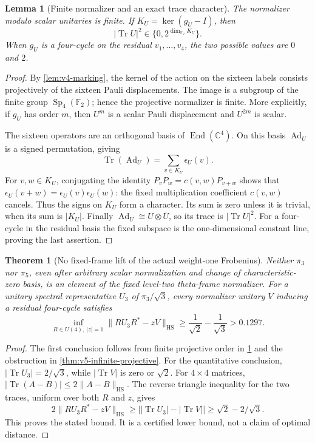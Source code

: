 \documentclass[11pt]{article}
\newtheorem{theorem}{Theorem}[section]
\newtheorem{lemma}[lemma]{Lemma}
\theoremstyle{definition}
\theoremstyle{remark}
\newcommand{\C}{\mathbb C}
\newcommand{\F}{\mathbb F}
\newcommand{\Tr}{\operatorname{Tr}}
\newcommand{\End}{\operatorname{End}}
\newcommand{\HS}{\mathrm{HS}}
\newcommand{\norm}[1]{\lVert#1\rVert}
\begin{document}
\begin{lemma}[Finite normalizer and an exact trace character]
\label{lem:v5-normalizer-trace}
The normalizer modulo scalar unitaries is finite. If
$K_U=\ker(g_U-I)$, then
\begin{equation}
 \boxed{|\Tr U|^2\in\{0,2^{\dim_{\F_2}K_U}\}.}
 \label{eq:v5-trace-character}
\end{equation}
When $g_U$ is a four-cycle on the residual $v_1,\ldots,v_4$, the two
possible values are $0$ and $2$.
\end{lemma}
\begin{proof}
By \cref{lem:v4-marking}, the kernel of the action on the sixteen labels
consists projectively of the sixteen Pauli displacements. The image is a
subgroup of the finite group $\operatorname{Sp}_4(\F_2)$; hence the
projective normalizer is finite. More explicitly, if $g_U$ has order $m$,
then $U^m$ is a scalar Pauli displacement and $U^{2m}$ is scalar.

The sixteen operators are an orthogonal basis of $\End(\C^4)$. On this
basis $\operatorname{Ad}_U$ is a signed permutation, giving
\[
 \Tr(\operatorname{Ad}_U)=\sum_{v\in K_U}\epsilon_U(v).
\]
For $v,w\in K_U$, conjugating the identity
$P_vP_w=c(v,w)P_{v+w}$ shows that
$\epsilon_U(v+w)=\epsilon_U(v)\epsilon_U(w)$: the fixed multiplication
coefficient $c(v,w)$ cancels. Thus the signs on $K_U$ form a character.
Its sum is zero unless it is trivial, when its sum is $|K_U|$.
Finally $\operatorname{Ad}_U\cong U\otimes\overline U$, so its trace is
$|\Tr U|^2$. For a four-cycle in the residual basis the fixed subspace is
the one-dimensional constant line, proving the last assertion.
\end{proof}

\begin{theorem}[No fixed-frame lift of the actual weight-one Frobenius]
\label{thm:v5-no-fixed-theta}
Neither $\pi_3$ nor $\pi_5$, even after arbitrary scalar normalization and
change of characteristic-zero basis, is an element of the fixed
level-two theta-frame normalizer.
For a unitary spectral representative $U_3$ of $\pi_3/\sqrt3$, every
normalizer unitary $V$ inducing a residual four-cycle satisfies
\begin{equation}
 \boxed{
 \inf_{R\in U(4),\ |z|=1}\norm{RU_3R^*-zV}_{\HS}
 \ge \frac1{\sqrt2}-\frac1{\sqrt3}>0.1297.}
 \label{eq:v5-normalizer-distance}
\end{equation}
\end{theorem}
\begin{proof}
The first conclusion follows from finite projective order in
\cref{lem:v5-normalizer-trace} and the obstruction in
\cref{thm:v5-infinite-projective}. For the quantitative conclusion,
$|\Tr U_3|=2/\sqrt3$, while $|\Tr V|$ is zero or $\sqrt2$.
For $4\times4$ matrices,
$|\Tr(A-B)|\le2\norm{A-B}_{\HS}$. The reverse triangle inequality for
the two traces, uniform over both $R$ and $z$, gives
\[
 2\norm{RU_3R^*-zV}_{\HS}
 \ge\bigl||\Tr U_3|-|\Tr V|\bigr|
 \ge\sqrt2-2/\sqrt3.
\]
This proves the stated bound. It is a certified lower bound, not a claim of
optimal distance.
\end{proof}
\end{document}
